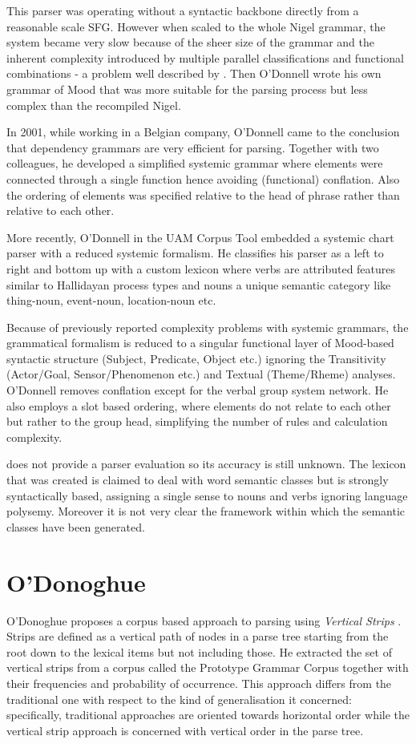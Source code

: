 This parser was operating without a syntactic backbone directly from a reasonable scale SFG. However when scaled to the whole Nigel grammar, the system became very slow because of the sheer size of the grammar and the inherent complexity introduced by multiple parallel classifications and functional combinations - a problem well described by \citet{Bateman2008}. Then O'Donnell wrote his own grammar of Mood that was more suitable for the parsing process but less complex than the recompiled Nigel.

In 2001, while working in a Belgian company, O'Donnell came to the conclusion that dependency grammars are very efficient for parsing. Together with two colleagues, he developed a simplified systemic grammar where elements were connected through a single function hence avoiding (functional) conflation. Also the ordering of elements was specified relative to the head of phrase rather than relative to each other.

More recently, O'Donnell in the UAM Corpus Tool embedded a systemic chart parser \citep{ODonnell2005a} with a reduced systemic formalism. He classifies his parser as a left to right and bottom up with a custom lexicon where verbs are attributed features similar to Hallidayan process types and nouns a unique semantic category like thing-noun, event-noun, location-noun etc.

Because of previously reported complexity problems \citep{ODonnell1993} with systemic grammars, the grammatical formalism is reduced to a singular functional layer of Mood-based syntactic structure (Subject, Predicate, Object etc.) ignoring the Transitivity (Actor/Goal, Sensor/Phenomenon etc.) and  Textual (Theme/Rheme) analyses. %
O'Donnell removes conflation except for the verbal group system network. He also employs a slot based ordering, where elements do not relate to each other but rather to the group head,  simplifying the number of rules and calculation complexity.   

\citet{ODonnell2005a} does not provide a parser evaluation so its accuracy is still unknown. The lexicon that was created is claimed to deal with word semantic classes but is strongly syntactically based, assigning a single sense to nouns and verbs ignoring language polysemy. Moreover it is not very clear the framework within which the semantic classes have been generated. 

\section{O'Donoghue} 
O'Donoghue proposes a corpus based approach to parsing using \textit{Vertical Strips} \citep{ODonoghue1991a}. Strips are defined as a vertical path of nodes in a parse tree starting from the root down to the lexical items but not including those. He extracted the set of vertical strips from a corpus called the Prototype Grammar Corpus together with their frequencies and probability of occurrence. This approach differs from the traditional one with respect to the kind of generalisation it concerned: specifically, traditional approaches are oriented towards horizontal order while the vertical strip approach is concerned with vertical order in the parse tree. 

